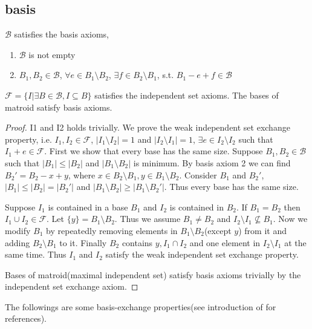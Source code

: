 \subsection{basis}
\begin{theorem}
    $\mathcal B$ satisfies the basis axioms,
    \begin{enumerate}
        \item $\mathcal B$ is not empty
        \item $B_1,B_2\in \mathcal B$, $\forall e\in B_1\setminus B_2$, $\exists f\in B_2\setminus B_1$, s.t. $B_1-e+f\in \mathcal B$
    \end{enumerate}

    $\mathcal F=\{I|\exists B\in \mathcal B, I\subseteq B\}$ satisfies the independent set axioms. The bases of matroid satisfy basis axioms.
\end{theorem}
\begin{proof}
    I1 and I2 holds trivially. We prove the weak independent set exchange property, i.e. $I_1,I_2\in \mathcal F$, $|I_1\setminus I_2|=1$ and $|I_2\setminus I_1|=1$, $\exists e\in I_2\setminus I_2$ such that $I_1+e\in \mathcal F$. 
    First we show that every base has the same size.
    Suppose $B_1,B_2\in \mathcal{B}$ such that $|B_1|\leq |B_2|$ and $|B_1\setminus B_2|$ is minimum. By basis axiom 2 we can find $B_2'=B_2-x+y$, where $x\in B_2\setminus B_1,y\in B_1\setminus B_2$. Consider $B_1$ and $B_2'$, $|B_1|\leq |B_2|=|B_2'|$ and $|B_1\setminus B_2|\geq |B_1\setminus B_2'|$. Thus every base has the same size.
    
    Suppose $I_1$ is contained in a base $B_1$ and $I_2$ is contained in $B_2$. If $B_1=B_2$ then $I_1\cup I_2\in \mathcal F$. Let $\{y\}=B_1\setminus B_2$.
    Thus we assume $B_1\not=B_2$ and $I_2\setminus I_1\not\subseteq B_1$. Now we modify $B_1$ by repeatedly removing elements in $B_1\setminus B_2$(except $y$) from it and adding $B_2\setminus B_1$ to it. Finally $B_2$ contains $y,I_1\cap I_2$ and one element in $I_2\setminus I_1$ at the same time. Thus $I_1$ and $I_2$ satisfy the weak independent set exchange property.

    Bases of matroid(maximal independent set) satisfy basis axioms trivially by the independent set exchange axiom.
\end{proof}

The followings are some basis-exchange properties(see introduction of \cite{Bonin_Savitsky_2016} for references).

